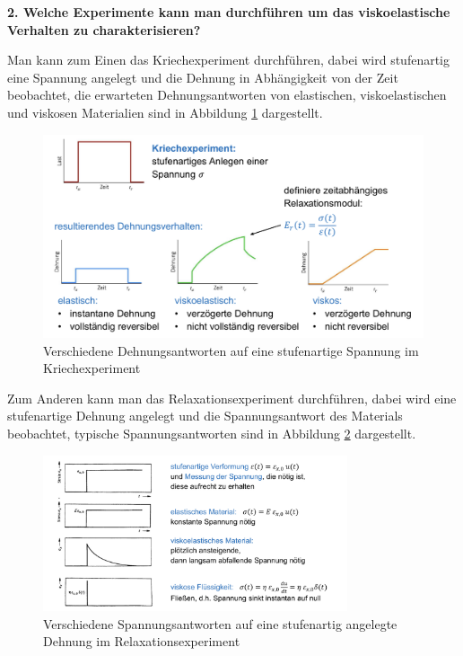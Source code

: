 \noindent\textbf{2. Welche Experimente kann man durchführen um das viskoelastische Verhalten zu charakterisieren?}\\
\begin{addmargin}[25pt]{0pt}
Man kann zum Einen das Kriechexperiment durchführen, dabei wird stufenartig eine Spannung angelegt und die Dehnung in Abhängigkeit von der Zeit beobachtet, die erwarteten Dehnungsantworten von elastischen, viskoelastischen und viskosen Materialien sind in Abbildung \ref{fig:Kriechexperiment} dargestellt.
\begin{figure}[h]
    \centering
    \includegraphics[width = \textwidth]{images/Materialwissenschaften/Kriechexperiment.jpeg}
    \caption{Verschiedene Dehnungsantworten auf eine stufenartige Spannung im Kriechexperiment}
    \label{fig:Kriechexperiment}
\end{figure}
Zum Anderen kann man das Relaxationsexperiment durchführen, dabei wird eine stufenartige Dehnung angelegt und die Spannungsantwort des Materials beobachtet, typische Spannungsantworten sind in Abbildung \ref{fig:Relaxationsexperiment} dargestellt.
\begin{figure}[h]
    \centering
    \includegraphics[width = 0.8\textwidth]{images/Materialwissenschaften/Relaxationsexperiment.jpeg}
    \caption{Verschiedene Spannungsantworten auf eine stufenartig angelegte Dehnung im Relaxationsexperiment}
    \label{fig:Relaxationsexperiment}
\end{figure}
\end{addmargin}

